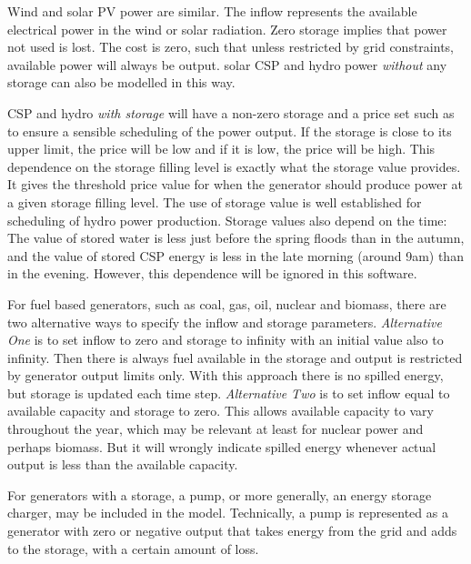 \documentclass{article}
\begin{document}
Wind and solar PV power are similar. The inflow represents the available electrical power in the wind or solar radiation. Zero storage implies that power not used is lost.  The cost is zero, such that unless restricted by grid constraints, available power will always be output.
solar CSP and hydro power \emph{without} any storage can also be modelled in this way.

CSP and hydro \emph{with storage} will have a non-zero storage and a price set such as to ensure a sensible scheduling of the power output. If the storage is close to its upper limit, the price will be low and if it is low, the price will be high. This dependence on the storage filling level is exactly what the storage value provides. It gives the threshold price value for when the generator should produce power at a given storage filling level. The use of storage value is well established for scheduling of hydro power production.
Storage values also depend on the time: The value of stored water is less just before the spring floods than in the autumn, and the value of stored CSP energy is less in the late morning (around 9am) than in the evening. However, this dependence will be ignored in this software.

For fuel based generators, such as coal, gas, oil, nuclear and biomass, there are two alternative ways to specify the inflow and storage parameters. 
\emph{Alternative One} is to set inflow to zero and storage to infinity with an initial value also to infinity. Then there is always fuel available in the storage and output is restricted by generator output limits only.  With this approach there is no spilled energy, but storage is updated each time step.
\emph{Alternative Two} is to set inflow equal to available capacity and storage to zero. This allows available capacity to vary throughout the year, which may be relevant at least for nuclear power and perhaps biomass. But it will wrongly indicate spilled energy whenever actual output is less than the available capacity.


For generators with a storage, a pump, or more generally, an energy storage charger, may be included in the model. Technically, a pump is represented as a generator with zero or negative output that takes energy from the grid and adds to the storage, with a certain amount of loss.
\end{document}

